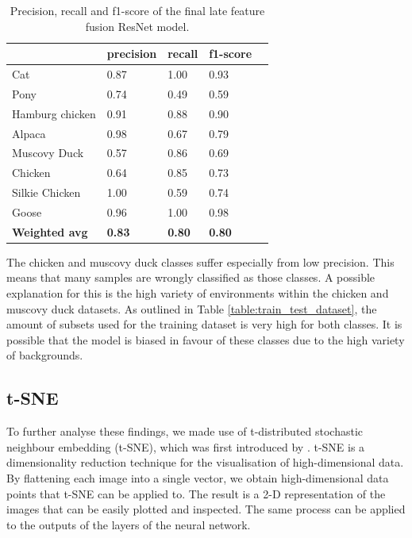 \documentclass{l4proj}
\begin{document}
\begin{table}[ht]
  \centering
  \begin{tabular}{@{}lllll@{}}
  \toprule
                        & \textbf{precision} & \textbf{recall} & \textbf{f1-score} &  \\ \midrule
  Cat                   & 0.87               & 1.00            & 0.93              &  \\
  Pony                  & 0.74               & 0.49            & 0.59              &  \\
  Hamburg chicken       & 0.91               & 0.88            & 0.90              &  \\
  Alpaca                & 0.98               & 0.67            & 0.79              &  \\
  Muscovy Duck          & 0.57               & 0.86            & 0.69              &  \\
  Chicken               & 0.64               & 0.85            & 0.73              &  \\
  Silkie Chicken        & 1.00               & 0.59            & 0.74              &  \\
  Goose                 & 0.96               & 1.00            & 0.98              &  \\
  \midrule
  \textbf{Weighted avg} & \textbf{0.83}      & \textbf{0.80}   & \textbf{0.80}     &  \\ \bottomrule
  \end{tabular}
  \caption{Precision, recall and f1-score of the final late feature fusion ResNet model.}
  \label{table:final_classifier_scores}
\end{table}

The chicken and muscovy duck classes suffer especially from low precision. This means that many samples are wrongly classified as those classes. A possible explanation for this is the high variety of environments within the chicken and muscovy duck datasets. As outlined in Table \ref{table:train_test_dataset}, the amount of subsets used for the training dataset is very high for both classes. It is possible that the model is biased in favour of these  classes due to the high variety of backgrounds.


\subsection{t-SNE}
\label{tsne}

To further analyse these findings, we made use of t-distributed stochastic neighbour embedding (t-SNE), which was first introduced by \citet{maaten_visualizing_2008}. t-SNE is a dimensionality reduction technique for the visualisation of high-dimensional data. By flattening each image into a single vector, we obtain high-dimensional data points that t-SNE can be applied to. The result is a 2-D representation of the images that can be easily plotted and inspected. The same process can be applied to the outputs of the layers of the neural network.
\end{document}
